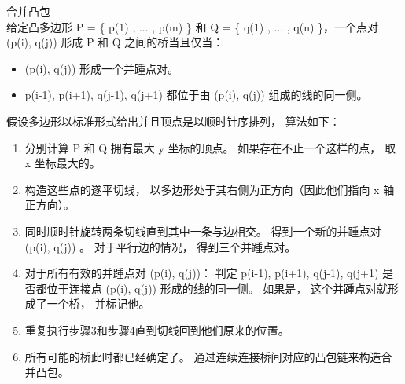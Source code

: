 合并凸包\\
给定凸多边形 P = \{ p(1) , ... , p(m) \} 和 Q = \{ q(1) , ... , q(n) \}，一个点对 (p(i), q(j)) 形成 P 和 Q 之间的桥当且仅当：
\begin{itemize}
\item (p(i), q(j)) 形成一个并踵点对。
\item p(i-1), p(i+1), q(j-1), q(j+1) 都位于由 (p(i), q(j)) 组成的线的同一侧。 
\end{itemize}

假设多边形以标准形式给出并且顶点是以顺时针序排列， 算法如下：

\begin{enumerate}
\item 分别计算 P 和 Q 拥有最大 y 坐标的顶点。 如果存在不止一个这样的点， 取 x 坐标最大的。
\item 构造这些点的遂平切线， 以多边形处于其右侧为正方向（因此他们指向 x 轴正方向）。
\item 同时顺时针旋转两条切线直到其中一条与边相交。 得到一个新的并踵点对 (p(i), q(j)) 。 对于平行边的情况， 得到三个并踵点对。
\item 对于所有有效的并踵点对 (p(i), q(j))： 判定 p(i-1), p(i+1), q(j-1), q(j+1) 是否都位于连接点 (p(i), q(j)) 形成的线的同一侧。 如果是， 这个并踵点对就形成了一个桥， 并标记他。
\item 重复执行步骤3和步骤4直到切线回到他们原来的位置。
\item 所有可能的桥此时都已经确定了。 通过连续连接桥间对应的凸包链来构造合并凸包。 
\end{enumerate}

